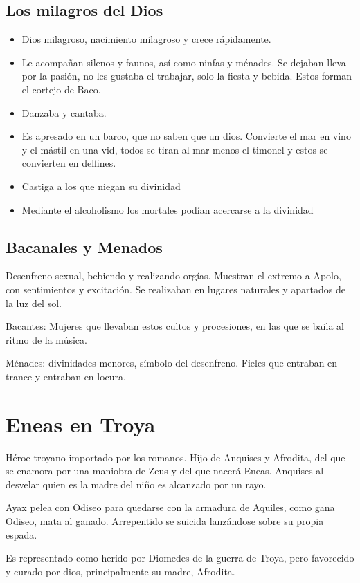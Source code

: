 \subsection{Los milagros del Dios}
\begin{itemize}
    \item Dios milagroso, nacimiento milagroso y crece rápidamente.
    \item Le acompañan silenos y faunos, así como ninfas y ménades. Se dejaban lleva por la pasión, no les gustaba el trabajar, solo la fiesta y bebida. Estos forman el cortejo de Baco.
    \item Danzaba y cantaba.
    \item Es apresado en un barco, que no saben que un dios. Convierte el mar en vino y el mástil en una vid, todos se tiran al mar menos el timonel y estos se convierten en delfines.
    \item Castiga a los que niegan su divinidad
    \item Mediante el alcoholismo los mortales podían acercarse a la divinidad
\end{itemize}

\subsection{Bacanales y Menados}
Desenfreno sexual, bebiendo y realizando orgías. Muestran el extremo a Apolo, con sentimientos y excitación. Se realizaban en lugares naturales y apartados de la luz del sol.

Bacantes: Mujeres que llevaban estos cultos y procesiones, en las que se baila al ritmo de la música.

Ménades: divinidades menores, símbolo del desenfreno. Fieles que entraban en trance y entraban en locura.

\section{Eneas en Troya}
Héroe troyano importado por los romanos. Hijo de Anquises y Afrodita, del que se enamora por una maniobra de Zeus y del que nacerá Eneas. Anquises al desvelar quien es la madre del niño es alcanzado por un rayo.

Ayax pelea con Odiseo para quedarse con la armadura de Aquiles, como gana Odiseo, mata al ganado. Arrepentido se suicida lanzándose sobre su propia espada.

Es representado como herido por Diomedes de la guerra de Troya, pero favorecido y curado por dios, principalmente su madre, Afrodita.

